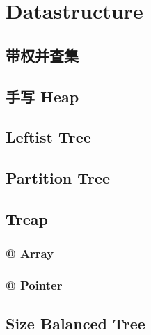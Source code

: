 \section{Datastructure}
	\subsection{带权并查集}
		
	\subsection{手写 Heap}
		
	\subsection{Leftist Tree}
		
	\subsection{Partition Tree}
		
	\subsection{Treap}
		\subsubsection{@ Array}
			
		\subsubsection{@ Pointer}
			
	\subsection{Size Balanced Tree}
		
